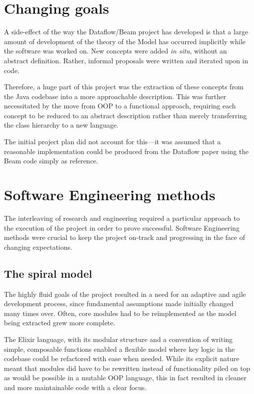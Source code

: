 \section{Changing goals}\label{sec:prep:goals}

A side-effect of the way the Dataflow/Beam project has developed is that a large amount of development of the theory of the Model has occurred implicitly while the software was worked on.
New concepts were added \emph{in situ}, without an abstract definition.
Rather, informal proposals were written and iterated upon in code.

Therefore, a huge part of this project was the extraction of these concepts from the Java codebase into a more approachable description.
This was further necessitated by the move from OOP to a functional approach, requiring each concept to be reduced to an abstract description rather than merely transferring the class hierarchy to a new language.

The initial project plan did not account for this---it was assumed that a reasonable implementation could be produced from the Dataflow paper \cite{Akidau:2015} using the Beam code simply as reference.

\section{Software Engineering methods}\label{sec:prep:softeng}

The interleaving of research and engineering required a particular approach to the execution of the project in order to prove successful.
Software Engineering methods were crucial to keep the project on-track and progressing in the face of changing expectations.


\subsection{The spiral model}\label{sec:prep:softeng:spiral}

The highly fluid goals of the project resulted in a need for an adaptive and agile development process, since fundamental assumptions made initially changed many times over.
Often, core modules had to be re\"implemented as the model being extracted grew more complete.

The Elixir language, with its modular structure and a convention of writing simple, composable functions enabled a flexible model where key logic in the codebase could be refactored with ease when needed.
While its explicit nature meant that modules did have to be rewritten instead of functionality piled on top as would be possible in a mutable OOP language, this in fact resulted in cleaner and more maintainable code with a clear focus.

